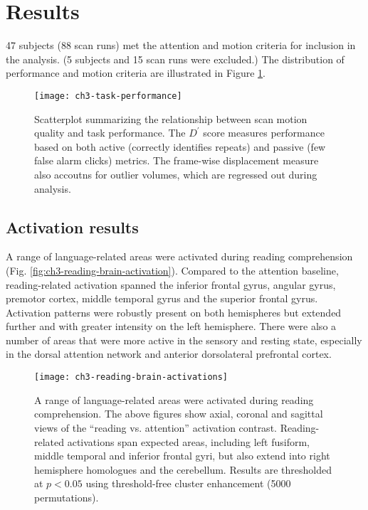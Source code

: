 \section{Results}

47 subjects (88 scan runs) met the attention and motion criteria for inclusion in the analysis. (5 subjects and 15 scan runs were excluded.) The distribution of performance and motion criteria are illustrated in Figure \ref{fig:ch3-task-performance}. 

\begin{figure}[t]
	\centering
	\texttt{[image: ch3-task-performance]}
    \caption[Description of scan motion quality and task performance.]{Scatterplot summarizing the relationship between scan motion quality and task performance. The $D^\prime$ score measures performance based on both active (correctly identifies repeats) and passive (few false alarm clicks) metrics. The frame-wise displacement measure also accoutns for outlier volumes, which are regressed out during analysis.}
	\label{fig:ch3-task-performance}
\end{figure}

\subsection{Activation results}

A range of language-related areas were activated during reading comprehension (Fig. \ref{fig:ch3-reading-brain-activation}). Compared to the attention baseline, reading-related activation spanned the inferior frontal gyrus, angular gyrus, premotor cortex, middle temporal gyrus and the superior frontal gyrus. Activation patterns were robustly present on both hemispheres but extended further and with greater intensity on the left hemisphere. There were also a number of areas that were more active in the sensory and resting state, especially in the dorsal attention network and anterior dorsolateral prefrontal cortex.

\begin{figure}[t]
	\centering
	\texttt{[image: ch3-reading-brain-activations]}
    \caption[A range of language-related areas were activated during reading comprehension.]{A range of language-related areas were activated during reading comprehension. The above figures show axial, coronal and sagittal views of the ``reading vs. attention'' activation contrast. Reading-related activations span expected areas, including left fusiform, middle temporal and inferior frontal gyri, but also extend into right hemisphere homologues and the cerebellum. Results are thresholded at $p < 0.05$ using threshold-free cluster enhancement (5000 permutations).}
	\label{fig:ch3-reading-brain-activations}
\end{figure}

